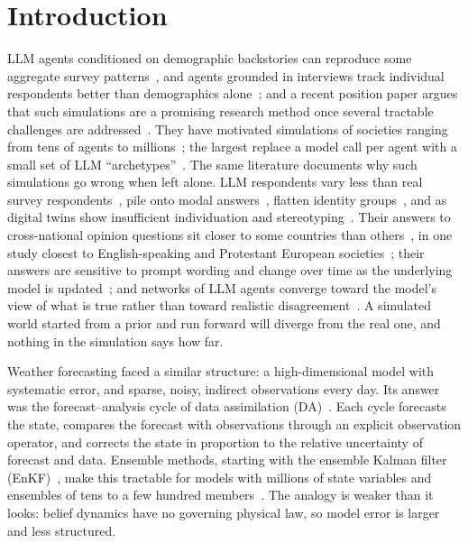 \documentclass[10pt]{article}
\theoremstyle{remark}
\begin{document}
\section{Introduction}

LLM agents conditioned on demographic backstories can reproduce some aggregate survey patterns~\cite{argyle2023}, and agents grounded in interviews track individual respondents better than demographics alone~\cite{park2024}; and a recent position paper argues that such simulations are a promising research method once several tractable challenges are addressed~\cite{anthis2025}. They have motivated simulations of societies ranging from tens of agents to millions~\cite{park2023,piao2025,yang2024oasis,chopra2024}; the largest replace a model call per agent with a small set of LLM ``archetypes''~\cite{chopra2024}. The same literature documents why such simulations go wrong when left alone. LLM respondents vary less than real survey respondents~\cite{bisbee2024}, pile onto modal answers~\cite{ozkan2026}, flatten identity groups~\cite{wang2024flatten}, and as digital twins show insufficient individuation and stereotyping~\cite{peng2025funhouse}. Their answers to cross-national opinion questions sit closer to some countries than others~\cite{durmus2023}, in one study closest to English-speaking and Protestant European societies~\cite{tao2024}; their answers are sensitive to prompt wording and change over time as the underlying model is updated~\cite{bisbee2024}; and networks of LLM agents converge toward the model's view of what is true rather than toward realistic disagreement~\cite{chuang2023}. A simulated world started from a prior and run forward will diverge from the real one, and nothing in the simulation says how far.

Weather forecasting faced a similar structure: a high-dimensional model with systematic error, and sparse, noisy, indirect observations every day. Its answer was the forecast--analysis cycle of data assimilation (DA)~\cite{carrassi2018}. Each cycle forecasts the state, compares the forecast with observations through an explicit observation operator, and corrects the state in proportion to the relative uncertainty of forecast and data. Ensemble methods, starting with the ensemble Kalman filter (EnKF)~\cite{evensen1994,burgers1998,houtekamer1998}, make this tractable for models with millions of state variables and ensembles of tens to a few hundred members~\cite{houtekamer2016}. The analogy is weaker than it looks: belief dynamics have no governing physical law, so model error is larger and less structured.
\end{document}
